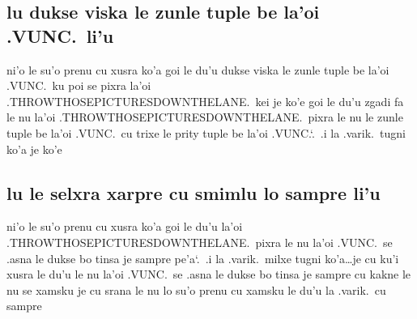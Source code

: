 \documentclass{report}
\newcommand\sds{\spacefactor\sfcode`.\ \space}
\begin{document}
\subsection{lu dukse viska le zunle tuple be la'oi .VUNC.\ li'u}
ni'o le su'o prenu cu xusra ko'a goi le du'u dukse viska le zunle tuple be la'oi .VUNC.\ ku poi se pixra la'oi .THROWTHOSEPICTURESDOWNTHELANE.\ kei je ko'e goi le du'u zgadi fa le nu la'oi .THROWTHOSEPICTURESDOWNTHELANE.\ pixra le nu le zunle tuple be la'oi .VUNC.\ cu trixe le prity tuple be la'oi .VUNC.\sds  .i la .varik.\ tugni ko'a je ko'e

\subsection{lu le selxra xarpre cu smimlu lo sampre li'u}
ni'o le su'o prenu cu xusra ko'a goi le du'u la'oi .THROWTHOSEPICTURESDOWNTHELANE.\ pixra le nu la'oi .VUNC.\ se .asna le dukse bo tinsa je sampre pe'a\sds  .i la .varik.\ milxe tugni ko'a\ldots je cu ku'i xusra le du'u le nu la'oi .VUNC.\ se .asna le dukse bo tinsa je sampre cu kakne le nu se xamsku je cu srana le nu lo su'o prenu cu xamsku le du'u la .varik.\ cu sampre
\end{document}
